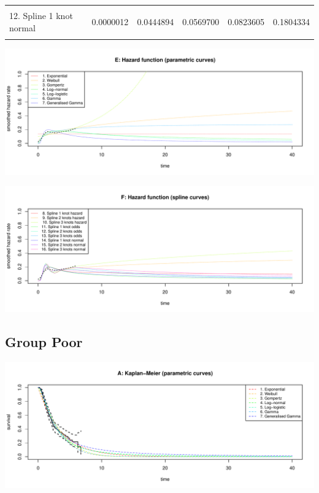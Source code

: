 \documentclass[]{article}
\begin{document}
\begin{tabular}{lrrrrr}
\cellcolor{gray!6}{11. Spline 2 knots odds} & \cellcolor{gray!6}{0.0000004} & \cellcolor{gray!6}{0.0500917} & \cellcolor{gray!6}{0.0706148} & \cellcolor{gray!6}{0.1135216} & \cellcolor{gray!6}{0.2192447}\\
12. Spline 1 knot normal & 0.0000012 & 0.0444894 & 0.0569700 & 0.0823605 & 0.1804334\\
\cellcolor{gray!6}{13. Spline 2 knots normal} & \cellcolor{gray!6}{0.0000000} & \cellcolor{gray!6}{0.0682231} & \cellcolor{gray!6}{0.0852159} & \cellcolor{gray!6}{0.1164045} & \cellcolor{gray!6}{0.2005479}\\
\bottomrule
\end{tabular}

\begin{flushleft}\includegraphics[height=0.29\textheight]{Images/validate_extrapolation2-5} \end{flushleft}

\begin{flushleft}\includegraphics[height=0.29\textheight]{Images/validate_extrapolation2-6} \end{flushleft}

\newpage

\subsection{Group Poor}\label{group-poor}

\begin{flushleft}\includegraphics[height=0.29\textheight]{Images/validate_extrapolation3-1} \end{flushleft}
\end{document}
